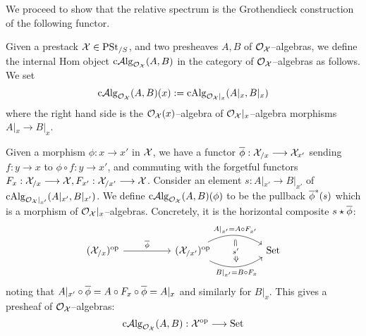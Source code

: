 \documentclass[11pt]{amsart}
\begin{document}
We proceed to show that the relative spectrum is the Grothendieck
construction of the following functor.

\begin{cns}
Given a prestack $\mathcal{X} \in \mathrm{PSt}_{/S}$, and two presheaves $A, B$ of
$\mathcal{O}_\mathcal{X}$--algebras, we define the internal Hom object
$\mathrm{c}\mathcal{A}\mathrm{lg}_{\mathcal{O}_\mathcal{X}}(A, B)$ in the category of $\mathcal{O}_\mathcal{X}$--algebras as follows.
We set
\[
\mathrm{c}\mathcal{A}\mathrm{lg}_{\mathcal{O}_\mathcal{X}}(A, B)(x) := \mathrm{cAlg}_{\mathcal{O}_\mathcal{X}|_x}(A|_x, B|_x)
\]
where the right hand side is the $\mathcal{O}_\mathcal{X}(x)$--algebra of
$\mathcal{O}_\mathcal{X}|_x$--algebra morphisms $A|_x \to B|_x$.

Given a morphism $\phi : x \to x'$ in $\mathcal{X}$, we have a functor
$\ol\phi : \mcX_{/x} \to \mcX_{x'}$ sending $f : y \to x$ to
$\phi \circ f : y \to x'$, and commuting with the forgetful functors
$F_x : \mcX_{/x} \to \mcX, F_{x'} : \mcX_{/x'} \to \mcX$.
Consider an element $s : A|_{x'} \to B|_{x'}$ of
$\mathrm{cAlg}_{\mathcal{O}_\mathcal{X}|_{x'}}(A|_{x'}, B|_{x'})$. We define
$\mathrm{c}\mathcal{A}\mathrm{lg}_{\mathcal{O}_\mathcal{X}}(A, B)(\phi)$ to be the pullback $\overline\phi^*(s)$ which is
a morphism of $\mathcal{O}_{\mathcal{X}}|_{x}$--algebras. Concretely, it is the
horizontal composite $s \star \overline\phi$:
\[\begin{tikzcd}[column sep=huge]
(\mcX_{/x})^\op \ar[r, "\ol\phi"] &
(\mcX_{/x'})^\op
  \ar[r, bend left=3em, ""{name=U, below}, "A|_{x'} = A \circ F_{x'}"]
  \ar[r, bend right=3em, ""{name=D, above}, "B|_{x'} = B \circ F_{x}" below]
  \ar[from=U, to=D, Rightarrow, "s'" description] &
\Set
\end{tikzcd}\]
noting that $A|_{x'} \circ \overline\phi = A \circ F_x \circ \overline\phi = A|_x$
and similarly for $B|_x$. This gives a presheaf of $\mathcal{O}_\mathcal{X}$--algebras:
\[
\CCAlg_{\mcO_\mcX}(A, B) : \mcX^\op \to \Set
\]
\end{cns}
\end{document}
